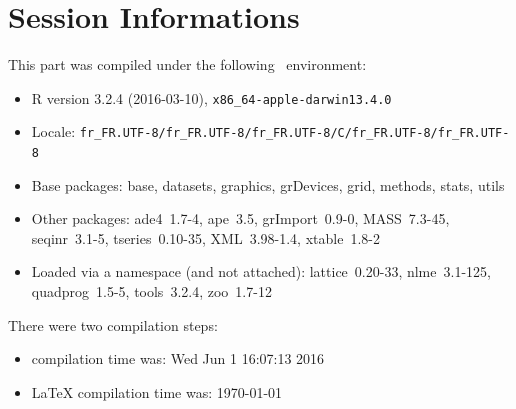 \documentclass{article}
\begin{document}
\section*{Session Informations}

\begin{scriptsize}

This part was compiled under the following \Rlogo{}~environment:

\begin{itemize}\raggedright
  \item R version 3.2.4 (2016-03-10), \verb|x86_64-apple-darwin13.4.0|
  \item Locale: \verb|fr_FR.UTF-8/fr_FR.UTF-8/fr_FR.UTF-8/C/fr_FR.UTF-8/fr_FR.UTF-8|
  \item Base packages: base, datasets, graphics, grDevices, grid,
    methods, stats, utils
  \item Other packages: ade4~1.7-4, ape~3.5, grImport~0.9-0,
    MASS~7.3-45, seqinr~3.1-5, tseries~0.10-35, XML~3.98-1.4,
    xtable~1.8-2
  \item Loaded via a namespace (and not attached): lattice~0.20-33,
    nlme~3.1-125, quadprog~1.5-5, tools~3.2.4, zoo~1.7-12
\end{itemize}
There were two compilation steps:

\begin{itemize}
  \item \Rlogo{} compilation time was: Wed Jun  1 16:07:13 2016
  \item \LaTeX{} compilation time was: \today
\end{itemize}

\end{scriptsize}


\clearpage
{}


\end{document}
